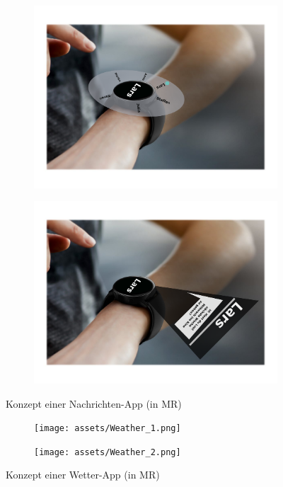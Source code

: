 \documentclass[11pt, a4paper]{article}
\begin{document}
\begin{figure}[h]
	\begin{subfigure}[c]{0.35\textwidth}
        \centering
		\includegraphics[scale=.25]{assets/Messages_1.png}
	\end{subfigure}
	\begin{subfigure}[c]{0.4\textwidth}
        \centering
		\includegraphics[scale=.25]{assets/Messages_2.png}
	\end{subfigure}
    \centering
	\caption{Konzept einer Nachrichten-App (in MR)}
    \label{fig:concept_of_a_messageApp}
\end{figure}

\begin{figure}[h]
	\begin{subfigure}[c]{0.35\textwidth}
        \centering
		\texttt{[image: assets/Weather\_1.png]}
	\end{subfigure}
	\begin{subfigure}[c]{0.4\textwidth}
        \centering
		\texttt{[image: assets/Weather\_2.png]}
	\end{subfigure}
    \centering
	\caption{Konzept einer Wetter-App (in MR)}
    \label{fig:concept_of_a_weatherApp}
\end{figure}
\end{document}

